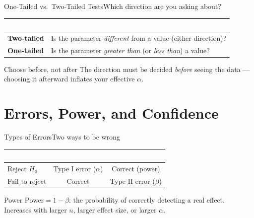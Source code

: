 \documentclass[aspectratio=169,11pt]{beamer}
\begin{document}
\begin{frame}{One-Tailed vs.\ Two-Tailed Tests}{Which direction are you asking about?}
  \small
  \renewcommand{\arraystretch}{1.3}
  \begin{center}
  \begin{tabularx}{\textwidth}{@{}>{\bfseries}l >{\raggedright\arraybackslash}X@{}}
    \toprule
    \rowcolor{PrimaryDark}
    \textcolor{white}{Type} & \textcolor{white}{Question} \\
    \midrule
    Two-tailed & Is the parameter \emph{different} from a value (either direction)? \\
    \rowcolor{PrimaryLight!25}
    One-tailed & Is the parameter \emph{greater than} (or \emph{less than}) a value? \\
    \bottomrule
  \end{tabularx}
  \end{center}
  \begin{alertblock}{Choose before, not after}
    \small The direction must be decided \emph{before} seeing the data —
    choosing it afterward inflates your effective $\alpha$.
  \end{alertblock}
\end{frame}

\section{Errors, Power, and Confidence}

\begin{frame}{Types of Errors}{Two ways to be wrong}
  \small
  \renewcommand{\arraystretch}{1.4}
  \begin{center}
  \begin{tabular}{@{}l cc@{}}
    \toprule
    \rowcolor{PrimaryDark}
    \textcolor{white}{} & \textcolor{white}{$H_0$ true} & \textcolor{white}{$H_0$ false} \\
    \midrule
    Reject $H_0$ & \cellcolor{AlertRed!25}Type I error ($\alpha$) & \cellcolor{SuccessGreen!25}Correct (power) \\
    \rowcolor{PrimaryLight!20}
    Fail to reject & Correct & Type II error ($\beta$) \\
    \bottomrule
  \end{tabular}
  \end{center}
  \begin{exampleblock}{Power}
    \small $\text{Power} = 1-\beta$: the probability of correctly detecting
    a real effect. Increases with larger $n$, larger effect size, or
    larger $\alpha$.
  \end{exampleblock}
\end{frame}
\end{document}
